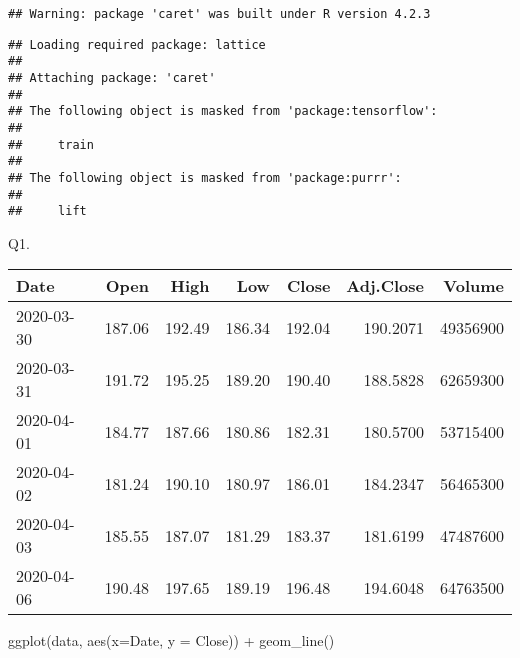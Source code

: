 \documentclass[
]{article}
\newenvironment{Shaded}{\begin{snugshade}}{\end{snugshade}}
\newcommand{\AttributeTok}[1]{\textcolor[rgb]{0.77,0.63,0.00}{#1}}
\newcommand{\CommentTok}[1]{\textcolor[rgb]{0.56,0.35,0.01}{\textit{#1}}}
\newcommand{\FunctionTok}[1]{\textcolor[rgb]{0.00,0.00,0.00}{#1}}
\newcommand{\NormalTok}[1]{#1}
\newcommand{\OtherTok}[1]{\textcolor[rgb]{0.56,0.35,0.01}{#1}}
\newcommand{\SpecialCharTok}[1]{\textcolor[rgb]{0.00,0.00,0.00}{#1}}
\newcommand{\StringTok}[1]{\textcolor[rgb]{0.31,0.60,0.02}{#1}}
\begin{document}
\begin{verbatim}
## Warning: package 'caret' was built under R version 4.2.3
\end{verbatim}

\begin{verbatim}
## Loading required package: lattice
## 
## Attaching package: 'caret'
## 
## The following object is masked from 'package:tensorflow':
## 
##     train
## 
## The following object is masked from 'package:purrr':
## 
##     lift
\end{verbatim}

Q1.

\begin{Shaded}
\end{Shaded}

\begin{longtable}[]{@{}lrrrrrr@{}}
\toprule()
Date & Open & High & Low & Close & Adj.Close & Volume \\
\midrule()
\endhead
2020-03-30 & 187.06 & 192.49 & 186.34 & 192.04 & 190.2071 & 49356900 \\
2020-03-31 & 191.72 & 195.25 & 189.20 & 190.40 & 188.5828 & 62659300 \\
2020-04-01 & 184.77 & 187.66 & 180.86 & 182.31 & 180.5700 & 53715400 \\
2020-04-02 & 181.24 & 190.10 & 180.97 & 186.01 & 184.2347 & 56465300 \\
2020-04-03 & 185.55 & 187.07 & 181.29 & 183.37 & 181.6199 & 47487600 \\
2020-04-06 & 190.48 & 197.65 & 189.19 & 196.48 & 194.6048 & 64763500 \\
\bottomrule()
\end{longtable}

\begin{Shaded}
\begin{Highlighting}[]
\FunctionTok{ggplot}\NormalTok{(data, }\FunctionTok{aes}\NormalTok{(}\AttributeTok{x=}\NormalTok{Date, }\AttributeTok{y =}\NormalTok{ Close)) }\SpecialCharTok{+} \FunctionTok{geom\_line}\NormalTok{()}
\end{Highlighting}
\end{Shaded}
\end{document}

